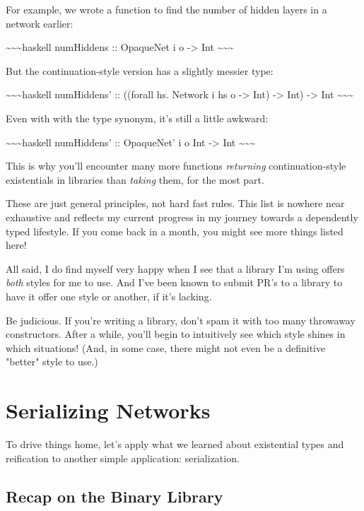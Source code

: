 \documentclass[]{article}
\begin{document}
\begin{itemize}
  For example, we wrote a function to find the number of hidden layers in a
  network earlier:

  \textasciitilde{}\textasciitilde{}\textasciitilde{}haskell numHiddens ::
  OpaqueNet i o -\textgreater{} Int
  \textasciitilde{}\textasciitilde{}\textasciitilde{}

  But the continuation-style version has a slightly messier type:

  \textasciitilde{}\textasciitilde{}\textasciitilde{}haskell numHiddens' ::
  ((forall hs. Network i hs o -\textgreater{} Int) -\textgreater{} Int)
  -\textgreater{} Int \textasciitilde{}\textasciitilde{}\textasciitilde{}

  Even with with the type synonym, it's still a little awkward:

  \textasciitilde{}\textasciitilde{}\textasciitilde{}haskell numHiddens' ::
  OpaqueNet' i o Int -\textgreater{} Int
  \textasciitilde{}\textasciitilde{}\textasciitilde{}

  This is why you'll encounter many more functions \emph{returning}
  continuation-style existentials in libraries than \emph{taking} them, for the
  most part.
\end{itemize}

These are just general principles, not hard fast rules. This list is nowhere
near exhaustive and reflects my current progress in my journey towards a
dependently typed lifestyle. If you come back in a month, you might see more
things listed here!

All said, I do find myself very happy when I see that a library I'm using offers
\emph{both} styles for me to use. And I've been known to submit PR's to a
library to have it offer one style or another, if it's lacking.

Be judicious. If you're writing a library, don't spam it with too many throwaway
constructors. After a while, you'll begin to intuitively see which style shines
in which situations! (And, in some case, there might not even be a definitive
"better" style to use.)

\section{Serializing Networks}

To drive things home, let's apply what we learned about existential types and
reification to another simple application: serialization.

\subsection{Recap on the Binary Library}
\end{document}
